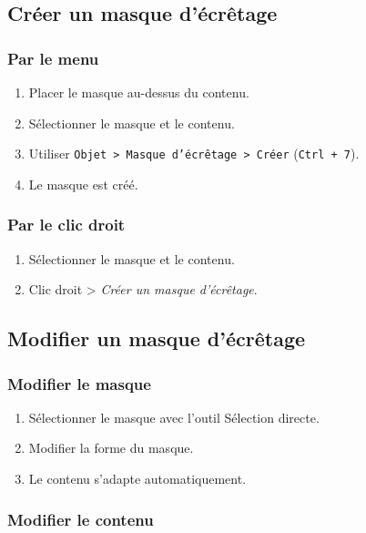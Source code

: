 \subsection{Créer un masque d'écrêtage}

\subsubsection{Par le menu}

\begin{enumerate}
    \item Placer le masque au-dessus du contenu.
    \item Sélectionner le masque et le contenu.
    \item Utiliser \texttt{Objet > Masque d'écrêtage > Créer} (\texttt{Ctrl + 7}).
    \item Le masque est créé.
\end{enumerate}

\subsubsection{Par le clic droit}

\begin{enumerate}
    \item Sélectionner le masque et le contenu.
    \item Clic droit > \emph{Créer un masque d'écrêtage}.
\end{enumerate}

\subsection{Modifier un masque d'écrêtage}

\subsubsection{Modifier le masque}

\begin{enumerate}
    \item Sélectionner le masque avec l'outil Sélection directe.
    \item Modifier la forme du masque.
    \item Le contenu s'adapte automatiquement.
\end{enumerate}

\subsubsection{Modifier le contenu}

